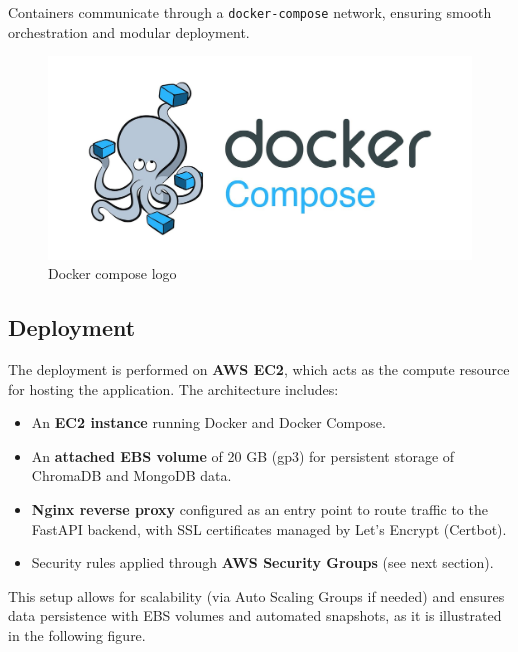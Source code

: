 Containers communicate through a \texttt{docker-compose} network,
ensuring smooth orchestration and modular deployment.
\begin{center}
\begin{figure}[H]
\includegraphics[scale=0.23]{images/docker_compose.jpeg}
\caption{Docker compose logo}
\label{fig:docker_compose_logo}
\end{figure}
\end{center}


\subsection{Deployment}
The deployment is performed on \textbf{AWS EC2}, which acts as the
compute resource for hosting the application. The architecture
includes:
\begin{itemize}
    \item An \textbf{EC2 instance} running Docker and Docker Compose.
    \item An \textbf{attached EBS volume} of 20 GB (gp3) for persistent
    storage of ChromaDB and MongoDB data.
    \item \textbf{Nginx reverse proxy} configured as an entry point to
    route traffic to the FastAPI backend, with SSL certificates managed
    by Let’s Encrypt (Certbot).
    \item Security rules applied through \textbf{AWS Security Groups}
    (see next section).
\end{itemize}

This setup allows for scalability (via Auto Scaling Groups if needed)
and ensures data persistence with EBS volumes and automated
snapshots, as it is illustrated in the following figure.

